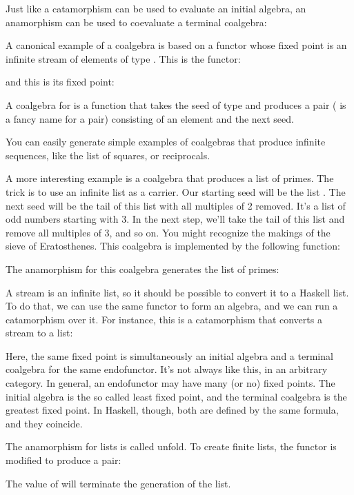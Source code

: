 Just like a catamorphism can be used to evaluate an initial algebra, an
anamorphism can be used to coevaluate a terminal coalgebra:

A canonical example of a coalgebra is based on a functor whose fixed
point is an infinite stream of elements of type . This is the
functor:

and this is its fixed point:

A coalgebra for  is a function that takes the seed of
type  and produces a pair ( is a fancy name
for a pair) consisting of an element and the next seed.

You can easily generate simple examples of coalgebras that produce
infinite sequences, like the list of squares, or reciprocals.

A more interesting example is a coalgebra that produces a list of
primes. The trick is to use an infinite list as a carrier. Our starting
seed will be the list \code{{[}2..{]}}. The next seed will be the tail
of this list with all multiples of 2 removed. It's a list of odd numbers
starting with 3. In the next step, we'll take the tail of this list and
remove all multiples of 3, and so on. You might recognize the makings of
the sieve of Eratosthenes. This coalgebra is implemented by the
following function:

The anamorphism for this coalgebra generates the list of primes:

A stream is an infinite list, so it should be possible to convert it to
a Haskell list. To do that, we can use the same functor 
to form an algebra, and we can run a catamorphism over it. For instance,
this is a catamorphism that converts a stream to a list:

Here, the same fixed point is simultaneously an initial algebra and a
terminal coalgebra for the same endofunctor. It's not always like this,
in an arbitrary category. In general, an endofunctor may have many (or
no) fixed points. The initial algebra is the so called least fixed
point, and the terminal coalgebra is the greatest fixed point. In
Haskell, though, both are defined by the same formula, and they
coincide.

The anamorphism for lists is called unfold. To create finite lists, the
functor is modified to produce a  pair:

The value of  will terminate the generation of the list.

